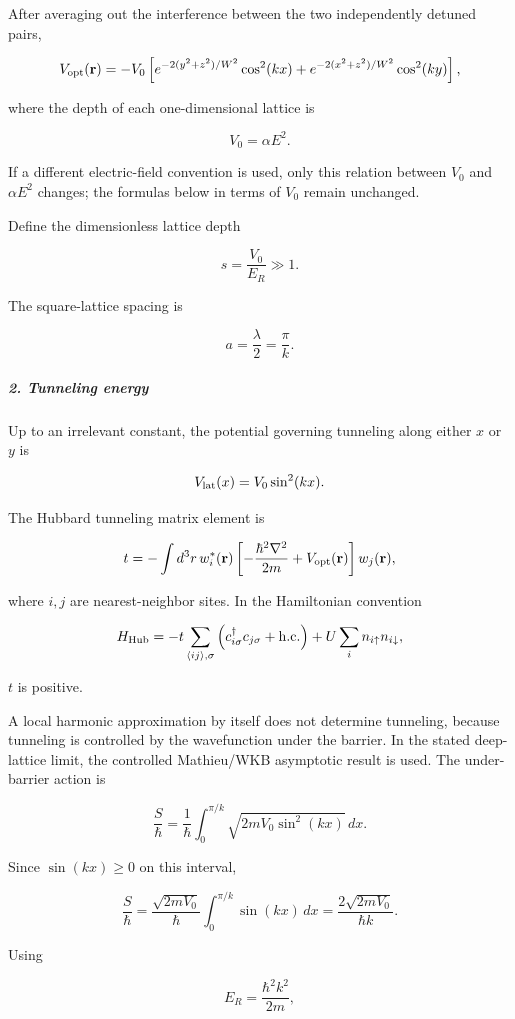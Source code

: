 After averaging out the interference between the two independently detuned pairs,

\[
V_{\rm opt}(\mathbf r) = -V_0\left[ e^{-2(y^2+z^2)/W^2}\cos^2(kx) + e^{-2(x^2+z^2)/W^2}\cos^2(ky) \right],
\]

where the depth of each one-dimensional lattice is

\[
{V_0=\alpha E^2}.
\]

If a different electric-field convention is used, only this relation between $V_0$ and $\alpha E^2$ changes; the formulas below in terms of $V_0$ remain unchanged.

Define the dimensionless lattice depth

\[
s=\frac{V_0}{E_R}\gg1.
\]

The square-lattice spacing is

\[
a=\frac{\lambda}{2}=\frac{\pi}{k}.
\]

\subparagraph*{2. Tunneling energy}

Up to an irrelevant constant, the potential governing tunneling along either $x$ or $y$ is

\[
V_{\rm lat}(x)=V_0\sin^2(kx).
\]

The Hubbard tunneling matrix element is

\[
t=-\int d^3r\, w_i^*(\mathbf r) \left[ -\frac{\hbar^2\nabla^2}{2m}+V_{\rm opt}(\mathbf r) \right] w_j(\mathbf r),
\]

where $i,j$ are nearest-neighbor sites. In the Hamiltonian convention

\[
H_{\rm Hub} = -t\sum_{\langle ij\rangle,\sigma} \left(c_{i\sigma}^\dagger c_{j\sigma}+{\rm h.c.}\right) +U\sum_i n_{i\uparrow}n_{i\downarrow},
\]

$t$ is positive.

A local harmonic approximation by itself does not determine tunneling, because tunneling is controlled by the wavefunction under the barrier. In the stated deep-lattice limit, the controlled Mathieu/WKB asymptotic result is used. The under-barrier action is

\[
\frac{S}{\hbar} = \frac{1}{\hbar}\int_0^{\pi/k} \sqrt{2mV_0\sin^2(kx)}\,dx.
\]

Since $\sin(kx)\geq0$ on this interval,

\[
\frac{S}{\hbar} = \frac{\sqrt{2mV_0}}{\hbar} \int_0^{\pi/k}\sin(kx)\,dx = \frac{2\sqrt{2mV_0}}{\hbar k}.
\]

Using

\[
E_R=\frac{\hbar^2k^2}{2m},
\]

